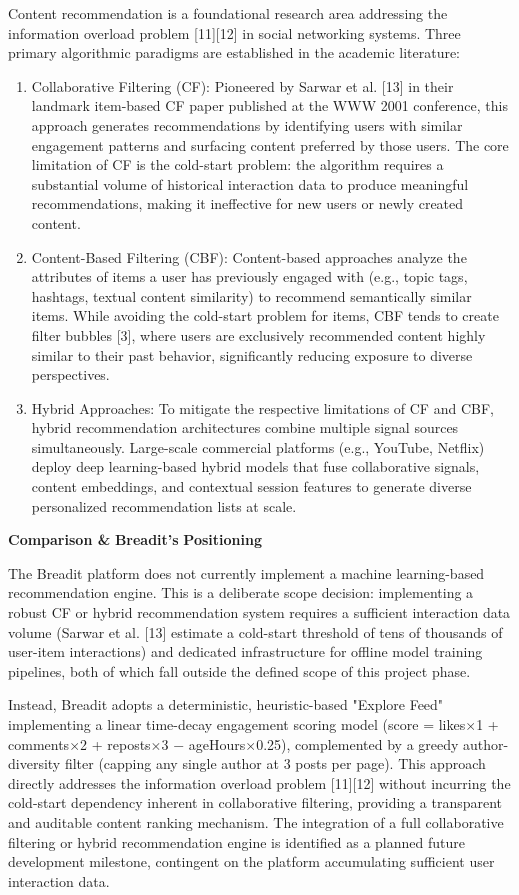 Content recommendation is a foundational research area addressing the information overload problem [11][12] in social networking systems. Three primary algorithmic paradigms are established in the academic literature:
\begin{enumerate}
  \item Collaborative Filtering (CF): Pioneered by Sarwar et al. [13] in their landmark item-based CF paper published at the WWW 2001 conference, this approach generates recommendations by identifying users with similar engagement patterns and surfacing content preferred by those users. The core limitation of CF is the cold-start problem: the algorithm requires a substantial volume of historical interaction data to produce meaningful recommendations, making it ineffective for new users or newly created content.
  \item Content-Based Filtering (CBF): Content-based approaches analyze the attributes of items a user has previously engaged with (e.g., topic tags, hashtags, textual content similarity) to recommend semantically similar items. While avoiding the cold-start problem for items, CBF tends to create filter bubbles [3], where users are exclusively recommended content highly similar to their past behavior, significantly reducing exposure to diverse perspectives.
  \item Hybrid Approaches: To mitigate the respective limitations of CF and CBF, hybrid recommendation architectures combine multiple signal sources simultaneously. Large-scale commercial platforms (e.g., YouTube, Netflix) deploy deep learning-based hybrid models that fuse collaborative signals, content embeddings, and contextual session features to generate diverse personalized recommendation lists at scale.
\end{enumerate}

\textbf{Comparison \& }\textbf{Breadit's}\textbf{ Positioning}

The Breadit platform does not currently implement a machine learning-based recommendation engine. This is a deliberate scope decision: implementing a robust CF or hybrid recommendation system requires a sufficient interaction data volume (Sarwar et al. [13] estimate a cold-start threshold of tens of thousands of user-item interactions) and dedicated infrastructure for offline model training pipelines, both of which fall outside the defined scope of this project phase.

Instead, Breadit adopts a deterministic, heuristic-based "Explore Feed" implementing a linear time-decay engagement scoring model (score = likes$\times$1 + comments$\times$2 + reposts$\times$3 $-$ ageHours$\times$0.25), complemented by a greedy author-diversity filter (capping any single author at 3 posts per page). This approach directly addresses the information overload problem [11][12] without incurring the cold-start dependency inherent in collaborative filtering, providing a transparent and auditable content ranking mechanism. The integration of a full collaborative filtering or hybrid recommendation engine is identified as a planned future development milestone, contingent on the platform accumulating sufficient user interaction data.

